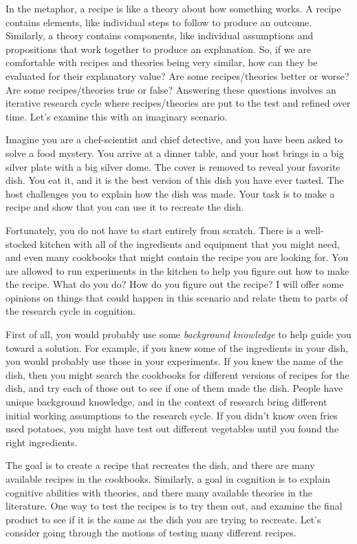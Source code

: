 \documentclass[
  oneside,
  12pt]{crumpbook}
\begin{document}
In the metaphor, a recipe is like a theory about how something works. A recipe contains elements, like individual steps to follow to produce an outcome. Similarly, a theory contains components, like individual assumptions and propositions that work together to produce an explanation. So, if we are comfortable with recipes and theories being very similar, how can they be evaluated for their explanatory value? Are some recipes/theories better or worse? Are some recipes/theories true or false? Answering these questions involves an iterative research cycle where recipes/theories are put to the test and refined over time. Let's examine this with an imaginary scenario.

Imagine you are a chef-scientist and chief detective, and you have been asked to solve a food mystery. You arrive at a dinner table, and your host brings in a big silver plate with a big silver dome. The cover is removed to reveal your favorite dish. You eat it, and it is the best version of this dish you have ever tasted. The host challenges you to explain how the dish was made. Your task is to make a recipe and show that you can use it to recreate the dish.

Fortunately, you do not have to start entirely from scratch. There is a well-stocked kitchen with all of the ingredients and equipment that you might need, and even many cookbooks that might contain the recipe you are looking for. You are allowed to run experiments in the kitchen to help you figure out how to make the recipe. What do you do? How do you figure out the recipe? I will offer some opinions on things that could happen in this scenario and relate them to parts of the research cycle in cognition.

First of all, you would probably use some \emph{background knowledge} to help guide you toward a solution. For example, if you knew some of the ingredients in your dish, you would probably use those in your experiments. If you knew the name of the dish, then you might search the cookbooks for different versions of recipes for the dish, and try each of those out to see if one of them made the dish. People have unique background knowledge, and in the context of research bring different initial working assumptions to the research cycle. If you didn't know oven fries used potatoes, you might have test out different vegetables until you found the right ingredients.

The goal is to create a recipe that recreates the dish, and there are many available recipes in the cookbooks. Similarly, a goal in cognition is to explain cognitive abilities with theories, and there many available theories in the literature. One way to test the recipes is to try them out, and examine the final product to see if it is the same as the dish you are trying to recreate. Let's consider going through the motions of testing many different recipes.
\end{document}
